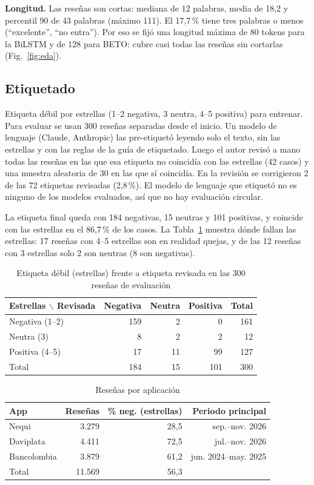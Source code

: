 \documentclass[conference]{IEEEtran}
\begin{document}
\textbf{Longitud.} Las reseñas son cortas: mediana de 12 palabras, media de 18,2 y percentil 90 de 43 palabras
(máximo 111). El 17,7\,\% tiene tres palabras o menos (``excelente'', ``no entra''). Por eso se fijó una longitud
máxima de 80 tokens para la BiLSTM y de 128 para BETO: cubre casi todas las reseñas sin cortarlas
(Fig.~\ref{fig:eda}).
\subsection{Etiquetado}
Etiqueta débil por estrellas (1--2 negativa, 3 neutra, 4--5 positiva) para entrenar. Para evaluar se usan 300
reseñas separadas desde el inicio. Un modelo de lenguaje (Claude, Anthropic) las pre-etiquetó leyendo solo el texto,
sin las estrellas y con las reglas de la guía de etiquetado. Luego el autor revisó a mano todas las reseñas en las que
esa etiqueta no coincidía con las estrellas (42 casos) y una muestra aleatoria de 30 en las que sí coincidía.
En la revisión se corrigieron 2 de las 72 etiquetas revisadas (2,8\,\%). El modelo de lenguaje que etiquetó no es
ninguno de los modelos evaluados, así que no hay evaluación circular.

La etiqueta final queda con 184 negativas, 15 neutras y 101 positivas, y coincide con las estrellas en el 86,7\,\%
de los casos. La Tabla~\ref{tab:estrellas} muestra dónde fallan las estrellas: 17 reseñas con 4--5 estrellas son en
realidad quejas, y de las 12 reseñas con 3 estrellas solo 2 son neutras (8 son negativas).

\begin{table}[t]
\caption{Etiqueta débil (estrellas) frente a etiqueta revisada en las 300 reseñas de evaluación}
\label{tab:estrellas}
\centering
\begin{tabular}{lrrrr}
\toprule
Estrellas $\backslash$ Revisada & Negativa & Neutra & Positiva & Total \\
\midrule
Negativa (1--2) & 159 & 2 & 0 & 161 \\
Neutra (3) & 8 & 2 & 2 & 12 \\
Positiva (4--5) & 17 & 11 & 99 & 127 \\
\midrule
Total & 184 & 15 & 101 & 300 \\
\bottomrule
\end{tabular}
\end{table}

\begin{table}[t]
\caption{Reseñas por aplicación}
\label{tab:datos}
\centering
\begin{tabular}{lrrr}
\toprule
App & Reseñas & \% neg. (estrellas) & Periodo principal \\
\midrule
Nequi & 3.279 & 28,5 & sep.--nov. 2026 \\
Daviplata & 4.411 & 72,5 & jul.--nov. 2026 \\
Bancolombia & 3.879 & 61,2 & jun. 2024--may. 2025 \\
\midrule
Total & 11.569 & 56,3 & \\
\bottomrule
\end{tabular}
\end{table}
\end{document}

